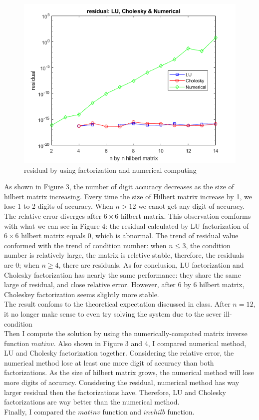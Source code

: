 \documentclass[a4paper]{article}
\begin{document}
\begin{figure}[H] 
\centering 
\includegraphics[width=1.0\textwidth]{1.2-2.png}
\caption{residual by using factorization and numerical computing} 
\label{Fig.1.2-2} 
\end{figure}
As shown in Figure 3, the number of digit accuracy decreases as the size of hilbert matrix increasing. Every time the size of Hilbert
matrix increase by 1, we lose 1 to 2 digits of accuracy. When $n > 12$ we canot get any digit of accuracy. The relative error diverges after $6\times 6$ hilbert matrix. This observation comforms with what we can see in Figure 4: the residual calculated by LU factorization of $6\times 6$ hilbert matrix equals 0, which is abnormal. The trend of residual value conformed with the trend of condition number: when $n \leq 3$, the condition number is relatively large, the matrix is reletive stable, therefore, the residuals are 0; when $n \geq 4$, there are residuals. As for conclusion, LU factorization and Cholesky factorization has nearly the same performance: they share
 the same large of residual, and close relative error. However, after 6 by 6 hilbert matrix, Choleskey factorization seems slightly more stable.\\
\indent The result confoms to the theoretical expectation discussed in class. After $n=12$, it no longer make sense to even try solving the system due to the sever ill-condition\\
\indent Then I compute the solution by using the numerically-computed matrix inverse function $matinv$. Also shown in Figure 3 and 4,
I compared numerical method, LU and Cholesky factorization together. Considering the relative error, the numerical method lose at least one more digit of accuracy than both factorizations. As the size of hilbert matrix grows, the numerical method will lose more digits of accuracy. Considering the residual, numerical method has way larger residual then the factorizations have. Therefore, LU and Cholesky factorizations are way better than the numerical method.\\
\indent Finally, I compared the $matinv$ function and $invhilb$ function.
\end{document}
